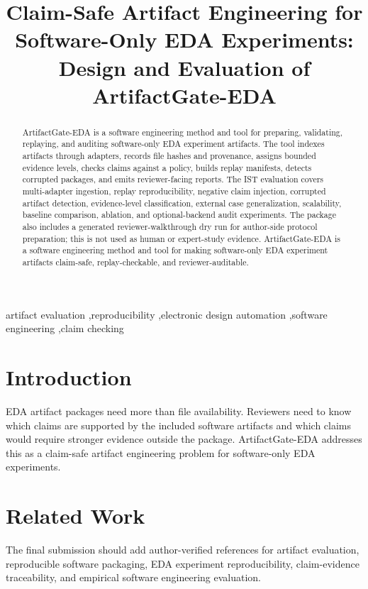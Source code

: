 \documentclass[preprint,12pt]{elsarticle}
\begin{document}
\begin{frontmatter}

\title{Claim-Safe Artifact Engineering for Software-Only EDA Experiments: Design and Evaluation of ArtifactGate-EDA}

\begin{abstract}
ArtifactGate-EDA is a software engineering method and tool for preparing,
validating, replaying, and auditing software-only EDA experiment artifacts. The
tool indexes artifacts through adapters, records file hashes and provenance,
assigns bounded evidence levels, checks claims against a policy, builds replay
manifests, detects corrupted packages, and emits reviewer-facing reports. The
IST evaluation covers multi-adapter ingestion, replay reproducibility, negative
claim injection, corrupted artifact detection, evidence-level classification,
external case generalization, scalability, baseline comparison, ablation, and
optional-backend audit experiments. The package also includes a generated
reviewer-walkthrough dry run for author-side protocol preparation; this is not
used as human or expert-study evidence.
ArtifactGate-EDA is a software engineering method and tool for making
software-only EDA experiment artifacts claim-safe, replay-checkable, and
reviewer-auditable.
\end{abstract}

\begin{keyword}
artifact evaluation \sep reproducibility \sep electronic design automation \sep software engineering \sep claim checking
\end{keyword}

\end{frontmatter}

\section{Introduction}

EDA artifact packages need more than file availability. Reviewers need to know
which claims are supported by the included software artifacts and which claims
would require stronger evidence outside the package. ArtifactGate-EDA addresses
this as a claim-safe artifact engineering problem for software-only EDA
experiments.

\section{Related Work}

The final submission should add author-verified references for artifact
evaluation, reproducible software packaging, EDA experiment reproducibility,
claim-evidence traceability, and empirical software engineering evaluation.
\end{document}
